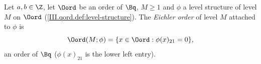 Let $a,b\in\Z$, let $\Oord$ be an order of $\Bq$, $M\ge1$ and $\phi$ a level structure of level $M$ on $\Oord$
(\cref{III.qord.def:level-structure}). The \emph{Eichler order} of level $M$ attached to $\phi$ is
\[
  \Oord(M;\phi)=\{x\in\Oord:\phi(x)_{21}=0\},
\]
an order of $\Bq$ ($\phi(x)_{21}$ is the lower left entry).
